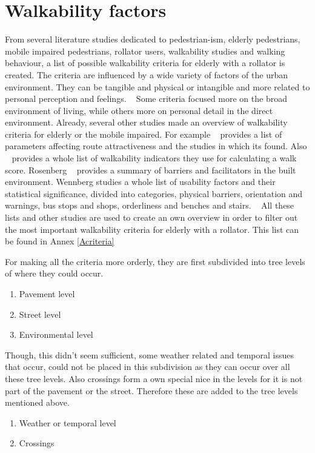 \section{Walkability factors}
From several literature studies dedicated to pedestrian-ism, elderly pedestrians, mobile impaired pedestrians, rollator users, walkability studies and walking behaviour, a list of possible walkability criteria for elderly with a rollator is created. The criteria are influenced by a wide variety of factors of the urban environment. They can be tangible and physical or intangible and more related to personal perception and feelings. ~\cite{Verschuur2014} Some criteria focused more on the broad environment of living, while others more on personal detail in the direct environment. 
Already, several other studies made an overview of walkability criteria for elderly or the mobile impaired. For example ~\cite{Verschuur2014} provides a list of parameters affecting route attractiveness and the studies in which its found. Also ~\cite{Duncan2011} provides a whole list of walkability indicators they use for calculating a walk score. Rosenberg ~\cite{Rosenberg2013} provides a summary of barriers and facilitators in the built environment. Wennberg studies a whole list of usability factors and their statistical significance, divided into categories, physical barriers, orientation and warnings, bus stops and shops, orderliness and benches and stairs. ~\cite{Wennberg2009} All these lists and other studies are used to create an own overview in order to filter out the most important walkability criteria for elderly with a rollator. This list can be found in Annex \ref{Acriteria}

For making all the criteria more orderly, they are first subdivided into tree levels of where they could occur. 

\begin{enumerate}
\item Pavement level
\item Street level
\item Environmental level
\end{enumerate}
Though, this didn't seem sufficient, some weather related and temporal issues that occur, could not be placed in this subdivision as they can occur over all these tree levels. Also crossings form a own special nice in the levels for it is not part of the pavement or the street. Therefore these are added to the tree levels mentioned above.
\begin{enumerate}
\item Weather or temporal level
\item Crossings
\end{enumerate}

